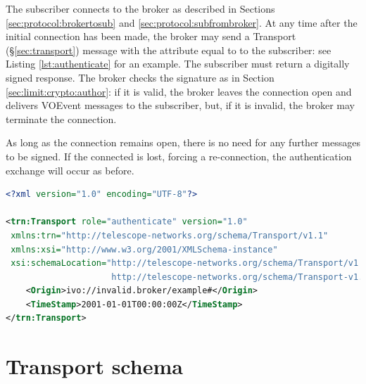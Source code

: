 \documentclass[a4paper,11pt]{ivoa}
\begin{document}
The subscriber connects to the broker as described in Sections
\ref{sec:protocol:brokertosub} and \ref{sec:protocol:subfrombroker}. At any
time after the initial connection has been made, the broker may send a
Transport (\S\ref{sec:transport}) message with the  attribute
equal to  to the subscriber: see Listing
\ref{lst:authenticate} for an example. The subscriber must return a digitally
signed  response. The broker checks the signature as in
Section \ref{sec:limit:crypto:author}: if it is valid, the broker leaves the
connection open and delivers VOEvent messages to the subscriber, but, if it is
invalid, the broker may terminate the connection.

As long as the connection remains open, there is no need for any further
messages to be signed. If the connected is lost, forcing a re-connection, the
authentication exchange will occur as before.

\begin{lstlisting}[language=XML,caption=Sample \xmlel{authenticate} message.,
                   label=lst:authenticate]
<?xml version="1.0" encoding="UTF-8"?>

<trn:Transport role="authenticate" version="1.0"
 xmlns:trn="http://telescope-networks.org/schema/Transport/v1.1"
 xmlns:xsi="http://www.w3.org/2001/XMLSchema-instance"
 xsi:schemaLocation="http://telescope-networks.org/schema/Transport/v1.1
                     http://telescope-networks.org/schema/Transport-v1.1.xsd">
    <Origin>ivo://invalid.broker/example#</Origin>
    <TimeStamp>2001-01-01T00:00:00Z</TimeStamp>
</trn:Transport>
\end{lstlisting}

\newpage
\appendix

\section{Transport schema}
\label{sec:transportschema}
\end{document}
